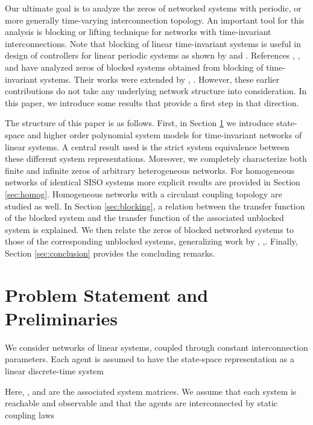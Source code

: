 \documentclass[twocolumn]{autart}    \usepackage{amsmath}
\begin{document}
Our ultimate goal is to analyze the zeros of networked systems with
periodic, or more  generally time-varying interconnection topology.
An important tool for this analysis is  blocking or lifting technique
for networks with time-invariant interconnections.  Note that blocking of linear time-invariant systems is  useful  in design of controllers for linear periodic systems  as shown by
\cite{chenB95} and \cite{Khargoneckar85}. References \cite{Bolzern86}, \cite{Grasselli88},
  \cite{zamani2011} and \cite{chen2010} have analyzed   zeros
    of blocked systems obtained from blocking of
  time-invariant  systems. Their works were  extended by
  \cite{zamani2011}, \cite{chen2010}.
However, these earlier contributions  do not take  any underlying network structure
  into consideration. In this paper,  we introduce some results that
  provide a first step in that direction.



The structure of this paper is as follows. First, in Section
\ref{sec:models} we introduce state-space and higher order
polynomial system models for time-invariant networks of linear
systems. A central result used is the strict system equivalence
between these different system representations.  Moreover, we
completely characterize  both finite and infinite zeros of arbitrary
heterogeneous networks. For homogeneous networks of identical SISO
systems more explicit results are provided in Section \ref{sec:homog}. Homogeneous networks with a
circulant coupling topology are studied as well. In Section  \ref{sec:blocking},
a relation between the transfer function of the blocked system and
the transfer function of the associated unblocked system is
explained.  We then relate the zeros of  blocked networked systems
to those  of the  corresponding unblocked systems, generalizing work by
\cite{zamani2011}, \cite{chen2010},\cite{MOHSEN-SCLpaper}.  Finally, Section \ref{sec:conclusion} provides the concluding remarks.



\section{Problem Statement and Preliminaries}
\label{sec:models}
We consider networks of  linear systems, coupled
through constant interconnection parameters. Each agent is assumed to
have the state-space representation as a linear discrete-time  system

Here,  ,  and  are the associated system matrices. We assume that each system is reachable and
observable and that the agents are interconnected by static
coupling laws
\end{document}
